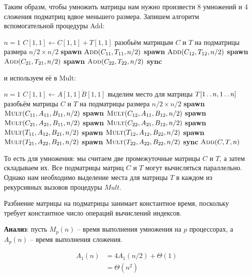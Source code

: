 \documentclass[a4paper,11pt]{article}
\begin{document}
Таким образм, чтобы умножить матрицы нам нужно произвести 8 умножений и 4
сложения подматриц вдвое меньшего размера. Запишем алгоритм вспомогательной
процедуры Add:

\begin{codebox}
\li \If $n = 1$
\li \Then $C[1, 1] \gets C[1, 1] + T[1, 1]$
\li \Return \End
\li разобьём матрицым $C$ и $T$ на подматрицы размера $n/2 \times n/2$
\li \textbf{spawn} $\textnormal{\scshape Add}(C_{11}, T_{11}, n/2)$
\li \textbf{spawn} $\textnormal{\scshape Add}(C_{12}, T_{12}, n/2)$
\li \textbf{spawn} $\textnormal{\scshape Add}(C_{21}, T_{21}, n/2)$
\li \textbf{spawn} $\textnormal{\scshape Add}(C_{22}, T_{22}, n/2)$
\li \textbf{sync}
\li \Return
\end{codebox}

и используем её в Mult:

\begin{codebox}
\li \If $n = 1$
\li \Then $C[1, 1] \gets A[1, 1] \dot B[1, 1]$
\li \Return \End
\li выделим место для матрицы $T[1 \mathinner{\ldotp\ldotp} n, 1 \mathinner{\ldotp\ldotp} n]$
\li разобьём матрицы $C$ и $T$ на подматрицы размера $n/2 \times n/2$
\li \textbf{spawn} $\textnormal{\scshape Mult}(C_{11}, A_{11}, B_{11}, n/2)$
\li \textbf{spawn} $\textnormal{\scshape Mult}(C_{12}, A_{11}, B_{12}, n/2)$
\li \textbf{spawn} $\textnormal{\scshape Mult}(C_{21}, A_{21}, B_{11}, n/2)$
\li \textbf{spawn} $\textnormal{\scshape Mult}(C_{22}, A_{21}, B_{12}, n/2)$
\li \textbf{spawn} $\textnormal{\scshape Mult}(T_{11}, A_{12}, B_{21}, n/2)$
\li \textbf{spawn} $\textnormal{\scshape Mult}(T_{12}, A_{12}, B_{22}, n/2)$
\li \textbf{spawn} $\textnormal{\scshape Mult}(T_{21}, A_{22}, B_{21}, n/2)$
\li \textbf{spawn} $\textnormal{\scshape Mult}(T_{22}, A_{22}, B_{22}, n/2)$
\li \textbf{sync}
\li $\textnormal{\scshape Add}(C, T, n)$
\li \Return
\end{codebox}

То есть для умножения: мы считаем две промежуточные матрицы $C$ и $T$, а затем
складываем их. Все подматрицы матриц $C$ и $T$ могут вычисляться параллельно.
Однако нам необходимо выделение места для матрицы $T$ в каждом из рекурсивных
вызовов процедуры $Mult$.

Разбиение матрицы на подматрицы занимает константное время, поскольку требует
константное число операций вычислений индексов.

\textbf{Анализ}: пусть $M_p(n)$ -- время выполнения умножения на $p$
процессорах, а $A_p(n)$ -- время выполнения сложения.

\begin{align*}
  A_1(n) &= 4A_1(n/2) + \Theta(1) \\
    &= \Theta(n^2)
\end{align*}
\end{document}
